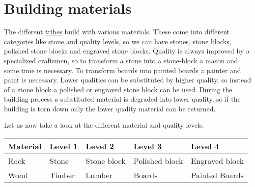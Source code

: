 \section{Building materials}\label{ch:Goods:Materials}

The different \hyperref[ch:Tribes]{tribes} build with various materials. These
come into different categories like stone and quality levels, so we can have
stones, stone blocks, polished stone blocks and engraved stone blocks. Quality
is always improved by a specialized craftsmen, so to transform a stone into a
stone-block a mason and some time is necessary. To transform boards into
painted boards a painter and paint is necessary. Lower qualities can be
substituted by higher quality, so instead of a stone block a polished or
engraved stone block can be used. During the building process a substituted
material is degraded into lower quality, so if the building is torn down only
the lower quality material can be returned.

Let us now take a look at the different material and quality levels.
\begin{longtable}{lllll}
	\toprule
	Material & Level 1      & Level 2     & Level 3        & Level 4        \\
	\midrule
	Rock     & Stone        & Stone block & Polished block & Engraved block \\
	Wood     & \Gls{Timber} & Lumber      & Boards         & Painted Boards \\
	\bottomrule
\end{longtable}
